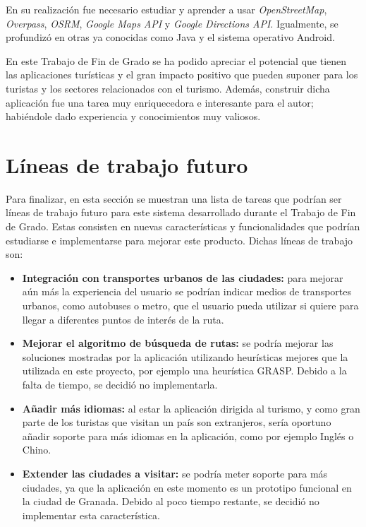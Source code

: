 En su realización fue necesario estudiar y aprender a usar \textit{OpenStreetMap}, \textit{Overpass}, \textit{OSRM}, \textit{Google Maps API} y \textit{Google Directions API}. Igualmente, se profundizó en otras ya conocidas como Java y el sistema operativo Android.\newline

En este Trabajo de Fin de Grado se ha podido apreciar el potencial que tienen las aplicaciones turísticas y el gran impacto positivo que pueden suponer para los turistas y los sectores relacionados con el turismo. Además, construir dicha aplicación fue una tarea muy enriquecedora e interesante para el autor; habiéndole dado experiencia y conocimientos muy valiosos.

\section[Trabajos futuros]{Líneas de trabajo futuro}
Para finalizar, en esta sección se muestran una lista de tareas que podrían ser líneas de trabajo futuro para este sistema desarrollado durante el Trabajo de Fin de Grado. Estas consisten en nuevas características y funcionalidades que podrían estudiarse e implementarse para mejorar este producto. Dichas líneas de trabajo son:
\begin{itemize}
	\item \textbf{Integración con transportes urbanos de las ciudades:} para mejorar aún más la experiencia del usuario se podrían indicar medios de transportes urbanos, como autobuses o metro, que el usuario pueda utilizar si quiere para llegar a diferentes puntos de interés de la ruta.
	\item \textbf{Mejorar el algoritmo de búsqueda de rutas:} se podría mejorar las soluciones mostradas por la aplicación utilizando heurísticas mejores que la utilizada en este proyecto, por ejemplo una heurística GRASP. Debido a la falta de tiempo, se decidió no implementarla.
	\item \textbf{Añadir más idiomas:} al estar la aplicación dirigida al turismo, y como gran parte de los turistas que visitan un país son extranjeros, sería oportuno añadir soporte para más idiomas en la aplicación, como por ejemplo Inglés o Chino.
	\item \textbf{Extender las ciudades a visitar:} se podría meter soporte para más ciudades, ya que la aplicación en este momento es un prototipo funcional en la ciudad de Granada. Debido al poco tiempo restante, se decidió no implementar esta característica.
\end{itemize}